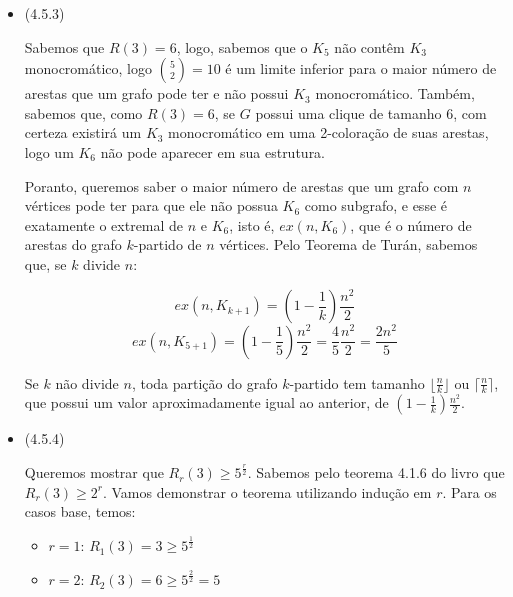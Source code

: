 \documentclass{article}
\begin{document}
\begin{itemize}
\begin{itemize}
	      \end{itemize}
	\item (4.5.3)

	      Sabemos que \(R(3) = 6\), logo, sabemos que o \(K_5\) não contêm \(K_3\) monocromático, logo \(\binom{5}{2} = 10\) é um limite inferior para o maior número de arestas que um grafo
	      pode ter e não possui \(K_3\) monocromático. Também, sabemos que, como \(R(3) = 6\), se \(G\) possui uma clique de tamanho 6, com certeza existirá um \(K_3\) monocromático em uma 2-coloração
	      de suas arestas, logo um \(K_6\) não pode aparecer em sua estrutura.

	      Poranto, queremos saber o maior número de arestas que um grafo com \(n\) vértices pode ter para que ele não possua \(K_6\) como subgrafo, e esse é exatamente o extremal de \(n\) e \(K_6\), isto é, \(ex(n, K_6)\), que é o número de arestas do grafo
	      \(k\)-partido de \(n\) vértices.
	      Pelo Teorema de Turán, sabemos que, se \(k\) divide \(n\):

	      \[ex(n, K_{k+1}) = (1 - \frac{1}{k})\frac{n^2}{2}\]
	      \[ex(n, K_{5+1}) = (1 - \frac{1}{5})\frac{n^2}{2} = \frac{4}{5}\frac{n^2}{2} = \frac{2n^2}{5}\]

	      Se \(k\) não divide \(n\), toda partição do grafo \(k\)-partido tem tamanho \(\lfloor \frac{n}{k} \rfloor\) ou \(\lceil \frac{n}{k} \rceil\), que possui um valor aproximadamente igual ao anterior, de \((1 - \frac{1}{k})\frac{n^2}{2}\).


	\item (4.5.4)

	      Queremos mostrar que \(R_r(3) \geq 5^{\frac{r}{2}}\). Sabemos pelo teorema 4.1.6 do livro que \(R_r(3) \geq 2^r\).
	      Vamos demonstrar o teorema utilizando indução em \(r\). Para os casos base, temos:

	      \begin{itemize}
		      \item $r = 1$: $R_1(3) = 3 \geq 5^{\frac{1}{2}}$
		      \item $r = 2$: $R_2(3) = 6 \geq 5^{\frac{2}{2}} = 5$
	      \end{itemize}


\end{itemize}
\end{document}
